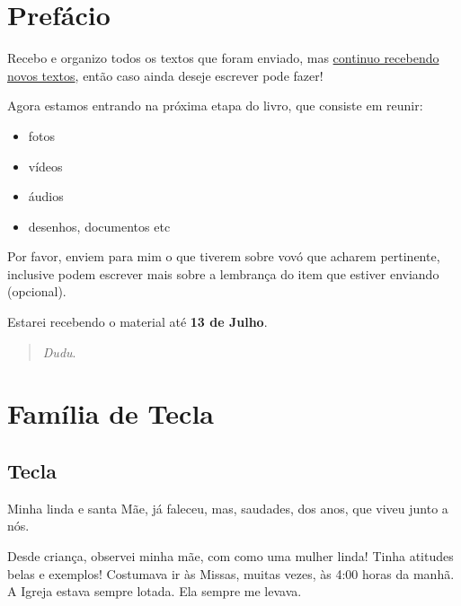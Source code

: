 \documentclass[
  brazil,
  a6paper,
  oneside,
  landscape,
  14pt]{scrbook}
\author{}
\date{}
\providecommand{\tightlist}{%
  \setlength{\itemsep}{0pt}\setlength{\parskip}{0pt}}
\begin{document}
\frontmatter

\pagestyle{empty}

{
\hypersetup{linkcolor=}
\setcounter{tocdepth}{2}
\tableofcontents
}
\mainmatter
\hypertarget{prefuxe1cio}{%
\chapter*{Prefácio}\label{prefuxe1cio}}

Recebo e organizo todos os textos que foram enviado, mas
\href{https://quarentinestudio.github.io/maria-santana-livro/\#onde-enviar-as-hist\%C3\%B3rias}{continuo
recebendo novos textos}, então caso ainda deseje escrever pode fazer!

Agora estamos entrando na próxima etapa do livro, que consiste em
reunir:

\begin{itemize}
\tightlist
\item
  fotos
\item
  vídeos
\item
  áudios
\item
  desenhos, documentos etc
\end{itemize}

Por favor, enviem para mim o que tiverem sobre vovó que acharem
pertinente, inclusive podem escrever mais sobre a lembrança do item que
estiver enviando (opcional).

Estarei recebendo o material até \textbf{13 de Julho}.

\begin{quote}
\emph{Dudu}.
\end{quote}

\hypertarget{famuxedlia-de-tecla}{%
\chapter{Família de Tecla}\label{famuxedlia-de-tecla}}

\hypertarget{tecla}{%
\section{Tecla}\label{tecla}}

Minha linda e santa Mãe, já faleceu, mas, saudades, dos anos, que viveu
junto a nós.

Desde criança, observei minha mãe, com como uma mulher linda! Tinha
atitudes belas e exemplos! Costumava ir às Missas, muitas vezes, às 4:00
horas da manhã. A Igreja estava sempre lotada. Ela sempre me levava.
\end{document}
